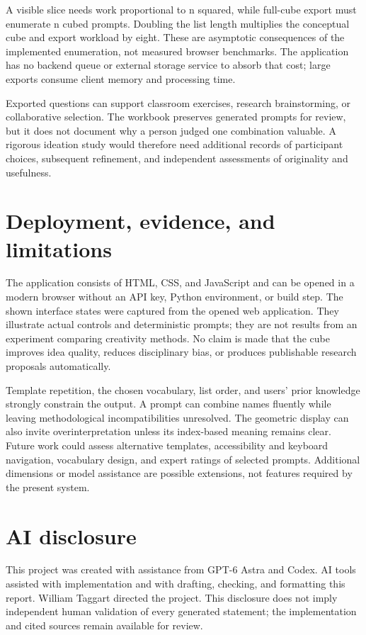 \documentclass[manuscript,screen,nonacm]{acmart}
\begin{document}
A visible slice needs work proportional to n squared, while full-cube export must enumerate n cubed prompts. Doubling the list length multiplies the conceptual cube and export workload by eight. These are asymptotic consequences of the implemented enumeration, not measured browser benchmarks. The application has no backend queue or external storage service to absorb that cost; large exports consume client memory and processing time.

Exported questions can support classroom exercises, research brainstorming, or collaborative selection. The workbook preserves generated prompts for review, but it does not document why a person judged one combination valuable. A rigorous ideation study would therefore need additional records of participant choices, subsequent refinement, and independent assessments of originality and usefulness.

\section{Deployment, evidence, and limitations}

The application consists of HTML, CSS, and JavaScript and can be opened in a modern browser without an API key, Python environment, or build step. The shown interface states were captured from the opened web application. They illustrate actual controls and deterministic prompts; they are not results from an experiment comparing creativity methods. No claim is made that the cube improves idea quality, reduces disciplinary bias, or produces publishable research proposals automatically.

Template repetition, the chosen vocabulary, list order, and users' prior knowledge strongly constrain the output. A prompt can combine names fluently while leaving methodological incompatibilities unresolved. The geometric display can also invite overinterpretation unless its index-based meaning remains clear. Future work could assess alternative templates, accessibility and keyboard navigation, vocabulary design, and expert ratings of selected prompts. Additional dimensions or model assistance are possible extensions, not features required by the present system.

\FloatBarrier
\section{AI disclosure}

This project was created with assistance from GPT-6 Astra and Codex. AI tools assisted with implementation and with drafting, checking, and formatting this report. William Taggart directed the project. This disclosure does not imply independent human validation of every generated statement; the implementation and cited sources remain available for review.
\end{document}
